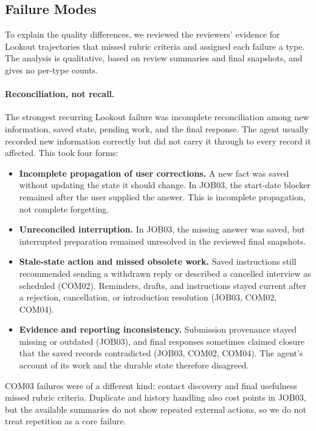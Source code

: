 \documentclass[twocolumn]{article}
\begin{document}
\subsection{Failure Modes}
\label{sec:failures}
To explain the quality differences, we reviewed the reviewers' evidence for Lookout trajectories that missed rubric criteria and assigned each failure a type. The analysis is qualitative, based on review summaries and final snapshots, and gives no per-type counts.

\paragraph{Reconciliation, not recall.}
The strongest recurring Lookout failure was incomplete reconciliation among new information, saved state, pending work, and the final response. The agent usually recorded new information correctly but did not carry it through to every record it affected. This took four forms:
\begin{itemize}
    \item \textbf{Incomplete propagation of user corrections.} A new fact was saved without updating the state it should change. In JOB03, the start-date blocker remained after the user supplied the answer. This is incomplete propagation, not complete forgetting.
    \item \textbf{Unreconciled interruption.} In JOB03, the missing answer was saved, but interrupted preparation remained unresolved in the reviewed final snapshots.
    \item \textbf{Stale-state action and missed obsolete work.} Saved instructions still recommended sending a withdrawn reply or described a cancelled interview as scheduled (COM02). Reminders, drafts, and instructions stayed current after a rejection, cancellation, or introduction resolution (JOB03, COM02, COM04).
    \item \textbf{Evidence and reporting inconsistency.} Submission provenance stayed missing or outdated (JOB03), and final responses sometimes claimed closure that the saved records contradicted (JOB03, COM02, COM04). The agent's account of its work and the durable state therefore disagreed.
\end{itemize}
COM03 failures were of a different kind: contact discovery and final usefulness missed rubric criteria. Duplicate and history handling also cost points in JOB03, but the available summaries do not show repeated external actions, so we do not treat repetition as a core failure.
\end{document}
